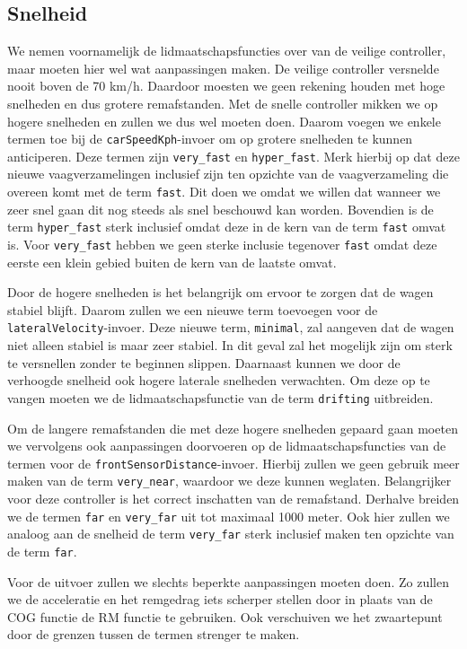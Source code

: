 \subsection{Snelheid}
We nemen voornamelijk de lidmaatschapsfuncties over van de veilige controller, maar moeten hier wel wat 
aanpassingen maken. De veilige controller versnelde nooit boven de 70 km/h. 
Daardoor moesten we geen rekening houden met hoge snelheden en dus grotere remafstanden. Met de snelle controller mikken we op hogere snelheden en zullen we dus wel moeten doen. Daarom voegen we enkele termen toe bij de 
\texttt{carSpeedKph}-invoer om op grotere snelheden te kunnen anticiperen. Deze termen zijn \texttt{very\_fast} en \texttt{hyper\_fast}. Merk hierbij op dat deze nieuwe vaagverzamelingen inclusief zijn ten opzichte van de vaagverzameling die overeen komt met de term \texttt{fast}. Dit doen we omdat we willen dat wanneer we zeer snel gaan dit nog steeds als snel beschouwd kan worden. Bovendien is de term \texttt{hyper\_fast} sterk inclusief omdat deze in de kern van de term \texttt{fast} omvat is. Voor \texttt{very\_fast} hebben we geen sterke inclusie tegenover \texttt{fast} omdat deze eerste een klein gebied buiten de kern van de laatste omvat.

Door de hogere snelheden is het belangrijk om ervoor te zorgen dat de wagen stabiel blijft. Daarom zullen we een nieuwe term toevoegen voor de \texttt{lateralVelocity}-invoer. Deze nieuwe term, \texttt{minimal}, zal aangeven dat de wagen niet alleen stabiel is maar zeer stabiel. In dit geval zal het mogelijk zijn om sterk te versnellen zonder te beginnen slippen. Daarnaast kunnen we door de verhoogde snelheid ook hogere laterale snelheden verwachten. Om deze op te vangen moeten we de lidmaatschapsfunctie van de term \texttt{drifting} uitbreiden.

Om de langere remafstanden die met deze hogere snelheden gepaard gaan moeten we vervolgens ook aanpassingen doorvoeren op de lidmaatschapsfuncties van de termen voor de \texttt{frontSensorDistance}-invoer. Hierbij zullen we geen gebruik meer maken van de term \texttt{very\_near}, waardoor we deze kunnen weglaten. Belangrijker voor deze controller is het correct inschatten van de remafstand. Derhalve breiden we de termen \texttt{far} en \texttt{very\_far} uit tot maximaal 1000 meter. Ook hier zullen we analoog aan de snelheid de term \texttt{very\_far} sterk inclusief maken ten opzichte van de term \texttt{far}.

Voor de uitvoer zullen we slechts beperkte aanpassingen moeten doen. Zo zullen we de acceleratie en het remgedrag iets scherper stellen door in plaats van de COG functie de RM functie te gebruiken. Ook verschuiven we het zwaartepunt door de grenzen tussen de termen strenger te maken.

